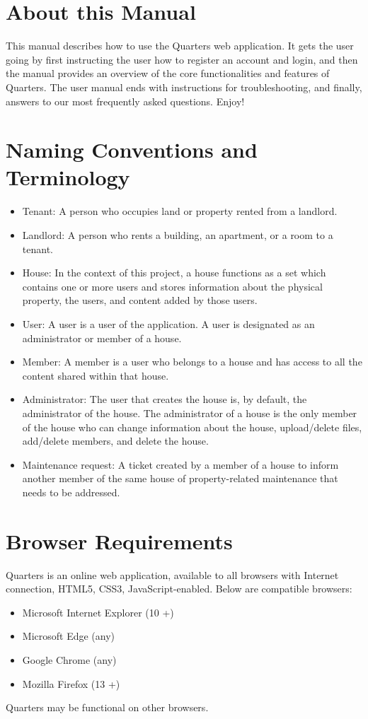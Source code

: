 \documentclass[12pt]{article}
\begin{document}
    \section{About this Manual}
    This manual describes how to use the Quarters web application. It gets the user going by first instructing the user how to register an account and login, and then the manual provides an overview of the core functionalities and features of Quarters. The user manual ends with instructions for troubleshooting, and finally, answers to our most frequently asked questions. Enjoy!

    \section{Naming Conventions and Terminology}
    \label{sec:conventions}
    \begin{itemize}
    \item Tenant: A person who occupies land or property rented from a landlord.
    \item Landlord: A person who rents a building, an apartment, or a room to a tenant.
    \item House: In the context of this project, a house functions as a set
      which contains one or more users and stores information about the
      physical property, the users, and content added by those users.
    \item User: A user is a user of the application. A user is designated as an administrator or member of a house.
    \item Member: A member is a user who belongs to a house and has access to all the content shared within that house.
    \item Administrator: The user that creates the house is, by default, the administrator of the house. The administrator of a house is the only member of the house who can change information about the house, upload/delete files, add/delete members, and delete the house.
    \item Maintenance request: A ticket created by a member of a house to inform another member of the same house of property-related maintenance that needs to be addressed.
    \end{itemize}

    \section{Browser Requirements}
    \label{sec:browserRequirement}
    Quarters is an online web application, available to all browsers with Internet connection, HTML5, CSS3, JavaScript-enabled. Below are compatible browsers:
    \begin{itemize}
        \item Microsoft Internet Explorer (10 +)
        \item Microsoft Edge (any)
        \item Google Chrome (any)
        \item Mozilla Firefox (13 +)
    \end{itemize}
    Quarters may be functional on other browsers.
\end{document}
